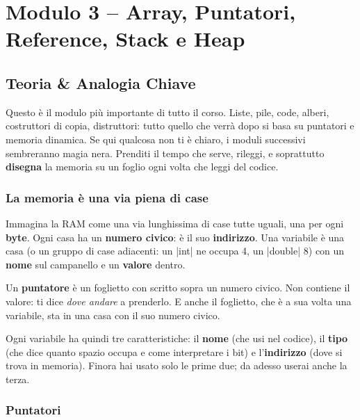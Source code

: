 \chapter{Modulo 3 -- Array, Puntatori, Reference, Stack e Heap}

\section{Teoria \& Analogia Chiave}

Questo è il modulo più importante di tutto il corso. Liste, pile, code, alberi,
costruttori di copia, distruttori: tutto quello che verrà dopo si basa su
puntatori e memoria dinamica. Se qui qualcosa non ti è chiaro, i moduli
successivi sembreranno magia nera. Prenditi il tempo che serve, rileggi, e
soprattutto \textbf{disegna} la memoria su un foglio ogni volta che leggi del codice.

\subsection*{La memoria è una via piena di case}

\begin{analogia}
Immagina la RAM come una via lunghissima di case tutte uguali, una per ogni
\textbf{byte}. Ogni casa ha un \textbf{numero civico}: è il suo
\textbf{indirizzo}. Una variabile è una casa (o un gruppo di case adiacenti:
un \cc|int| ne occupa 4, un \cc|double| 8) con un \textbf{nome} sul
campanello e un \textbf{valore} dentro.

Un \textbf{puntatore} è un foglietto con scritto sopra un numero civico. Non
contiene il valore: ti dice \emph{dove andare} a prenderlo. E anche il
foglietto, che è a sua volta una variabile, sta in una casa con il suo numero civico.
\end{analogia}

Ogni variabile ha quindi tre caratteristiche: il \textbf{nome} (che usi nel
codice), il \textbf{tipo} (che dice quanto spazio occupa e come interpretare i
bit) e l'\textbf{indirizzo} (dove si trova in memoria). Finora hai usato solo
le prime due; da adesso userai anche la terza.

\subsection*{Puntatori}

